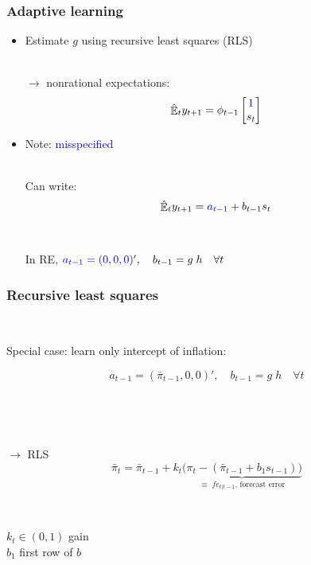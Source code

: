 \documentclass[11pt]{beamer}
\DeclareMathOperator{\E}{\mathbb{E}}
\begin{document}
\begin{frame}
	\frametitle{Adaptive learning}
	\label{adaptive_learning}

\begin{itemize}
\item Estimate $g$ using recursive least squares (RLS)
  \\
  
  \
  
$\rightarrow$ nonrational expectations:
\begin{equation} 
\hat{\E}_t y_{t+1} = \phi_{t-1}\begin{bmatrix} \textcolor{blue}{1} \\ s_{t} \end{bmatrix} \label{PLMcompact}
\end{equation}

\item Note: \textcolor{blue}{misspecified}	\\

\

Can write:
\begin{equation}
\hat{\E}_t y_{t+1} = \textcolor{blue}{a_{t-1}} + b_{t-1}s_t  \label{PLM_fcst_general}
\end{equation}

\

In RE, $\textcolor{blue}{a_{t-1} = (0,0,0)'}, \quad b_{t-1} = g\;h \quad \forall t$
\end{itemize}


\end{frame}

\begin{frame}
	\frametitle{Recursive least squares}
	\label{RLS_special}
	
	\
	
Special case: learn only intercept of inflation:

\begin{equation}
a_{t-1} = (\bar{\pi}_{t-1},0,0)', \quad b_{t-1} = g\; h \quad \forall t
\end{equation}

\

\

$\rightarrow$ RLS
\begin{equation}
\bar{\pi}_{t}  =\bar{\pi}_{t-1} +k_t \underbrace{\big(\pi_{t} -(\bar{\pi}_{t-1}+b_1 s_{t-1}) \big)}_{\equiv \; fe_{t|t-1} \text{, forecast error} } 
\end{equation}
 
 \
 
 $k_t \in (0,1)$ gain \\
 $b_1$ first row of $b$
\vfill 

\hfill \hyperlink{RLS}{}




\end{frame}
\end{document}
